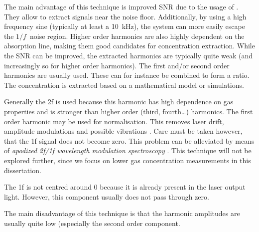 \documentclass[\home/main.tex]{subfiles}
\begin{document}
    The main advantage of this technique is improved \acrfull{SNR} due to the usage of . They allow to extract signals near the noise floor. Additionally, by using a high frequency sine (typically at least a \SI{10}{\kilo\hertz}), the system can more easily escape the $1/f$~noise region. Higher order harmonics are also highly dependent on the absorption line, making them good candidates for concentration extraction. While the \acrshort{SNR} can be improved, the extracted harmonics are typically quite weak (and increasingly so for higher order harmonics). The first and/or second order harmonics are usually used. These can for instance be combined to form a ratio. The concentration is extracted based on a mathematical model or simulations. 
    
    Generally the \acrfull{2f} is used because this harmonic has high dependence on gas properties and is stronger than higher order (third, fourth\ldots) harmonics. The first order harmonic may be used for normalisation. This removes laser drift, amplitude modulations and possible vibrations \cite{RiekerDissertation}. Care must be taken however, that the \acrfull{1f} signal does not become zero. This problem can be alleviated by means of \emph{apodized 2f/1f wavelength modulation spectroscopy} \cite{apodized-WMS}. This technique will not be explored further, since we focus on lower gas concentration measurements in this dissertation.
    
    The \acrshort{1f} is not centred around \num{0} because it is already present in the laser output light. However, this component usually does not pass through zero.
    
    The main disadvantage of this technique is that the harmonic amplitudes are usually quite low (especially the second order component.    
    
\end{document}
